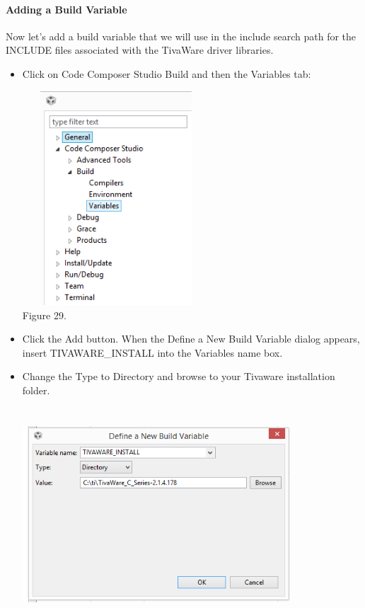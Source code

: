 \documentclass[a4paper,10pt,oneside]{article}
\begin{document}
					\paragraph{\textbf{Adding a Build Variable}\\}
					Now let’s add a build variable that we will use in the include search path for the INCLUDE files
					associated with the TivaWare driver libraries.
					\begin{itemize}
						\item Click on Code Composer Studio Build and then the Variables tab:\\
						\begin{center}
							\includegraphics[width=7cm, height=8cm]{Images/AddVariables7}\\
						Figure 29.	
					\end{center}
						\item Click the Add button. When the Define a New
						Build Variable dialog appears,
						insert TIVAWARE\_INSTALL into the Variables
						name box.\\
						\item Change the Type to Directory and
						browse to your Tivaware installation
						folder.\\
						\begin{center}
						\includegraphics[width=10cm, height=8cm]{Images/AddVariables8}\\

\end{center}
\end{itemize}
\end{document}

